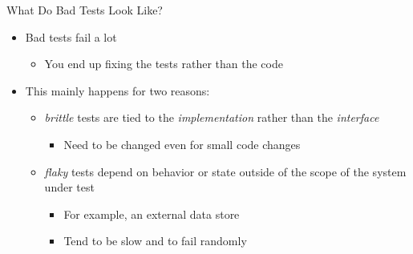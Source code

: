 \documentclass[
ps,
]{prosper}
\begin{document}
\begin{slide}{What Do Bad Tests Look Like?}

\begin{itemize}
  
\item  Bad tests fail a lot 

  \begin{itemize}
    
  \item You end up fixing the tests rather than the code

  \end{itemize}

  \item This mainly happens for two reasons:
    
    \begin{itemize}
      
    \item \textit{brittle} tests are tied to the \textit{implementation}
      rather than the \textit{interface}
      
      \begin{itemize}
        
      \item Need to be changed even for small code changes
        
      \end{itemize}
      
    \item \textit{flaky} tests depend on behavior or state outside of the
      scope of the system under test

      \begin{itemize}
        
      \item For example, an external data store
        
      \item Tend to be slow and to fail randomly
        
      \end{itemize}
      
    \end{itemize}
    
\end{itemize}

\end{slide}
\end{document}
